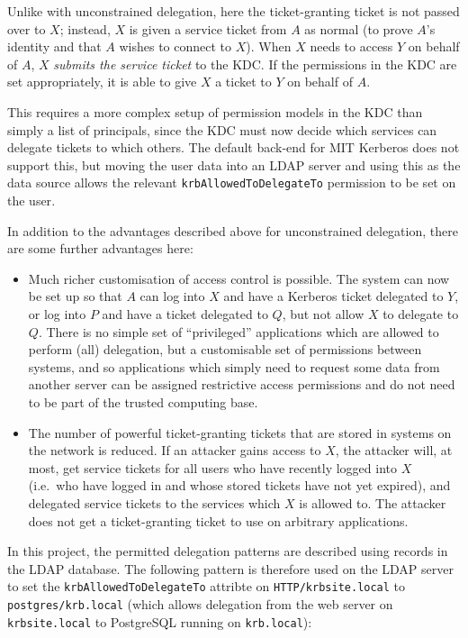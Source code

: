 \documentclass[12pt]{report}
\begin{document}
Unlike with unconstrained delegation, here the ticket-granting ticket is not passed over to $X$; instead, $X$ is given a service ticket from $A$ as normal (to prove $A$'s identity and that $A$ wishes to connect to $X$). When $X$ needs to access $Y$ on behalf of $A$, $X$ \textit{submits the service ticket} to the KDC. If the permissions in the KDC are set appropriately, it is able to give $X$ a ticket to $Y$ on behalf of $A$.

This requires a more complex setup of permission models in the KDC than simply a list of principals, since the KDC must now decide which services can delegate tickets to which others. The default back-end for MIT Kerberos does not support this, but moving the user data into an LDAP server and using this as the data source allows the relevant \texttt{krbAllowedToDelegateTo} permission to be set on the user\cite{KRB-DELEG}.

In addition to the advantages described above for unconstrained delegation, there are some further advantages here:

\begin{itemize}
\item
  Much richer customisation of access control is possible. The system can now be set up so that $A$ can log into $X$ and have a Kerberos ticket delegated to $Y$, or log into $P$ and have a ticket delegated to $Q$, but not allow $X$ to delegate to $Q$. There is no simple set of ``privileged'' applications which are allowed to perform (all) delegation, but a customisable set of permissions between systems, and so applications which simply need to request some data from another server can be assigned restrictive access permissions and do not need to be part of the trusted computing base.
\item
  The number of powerful ticket-granting tickets that are stored in systems on the network is reduced. If an attacker gains access to $X$, the attacker will, at most, get service tickets for all users who have recently logged into $X$ (i.e.\ who have logged in and whose stored tickets have not yet expired), and delegated service tickets to the services which $X$ is allowed to. The attacker does not get a ticket-granting ticket to use on arbitrary applications.
\end{itemize}

In this project, the permitted delegation patterns are described using records in the LDAP database. The following pattern is therefore used on the LDAP server to set the \texttt{krbAllowedToDelegateTo} attribte on \verb+HTTP/krbsite.local+ to \verb+postgres/krb.local+ (which allows delegation from the web server on \verb+krbsite.local+ to PostgreSQL running on \verb+krb.local+):
\end{document}

